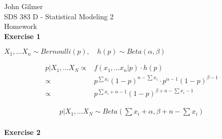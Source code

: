 \documentclass[11pt]{article}
\begin{document}
    \noindent John Gilmer \\
    \noindent SDS 383 D - Statistical Modeling 2 \\
    \noindent Homework \\

    \textbf{Exercise 1}

    \(X_1, \dots X_n \sim Bernoulli(p), \quad h(p) \sim Beta(\alpha, \beta)\)

    \begin{align*}
        p | X_1, \dots X_N \propto& f(x_1, \dots x_n |p) \cdot h(p) \\
        \propto&  p^{\sum x_i} (1 - p)^{n- \sum x_i} \cdot p^{\alpha - 1} (1 - p) ^{\beta - 1} \\
        \propto&  p^{\sum x_i + \alpha - 1} (1 - p)^{\beta + n - \sum x_i - 1}
    \end{align*}

    \begin{align*}
      p | X_1, \dots X_N \sim Beta(\sum x_i + \alpha, \beta + n - \sum x_i)
    \end{align*}
    \\

    \textbf{Exercise 2}
\end{document}
